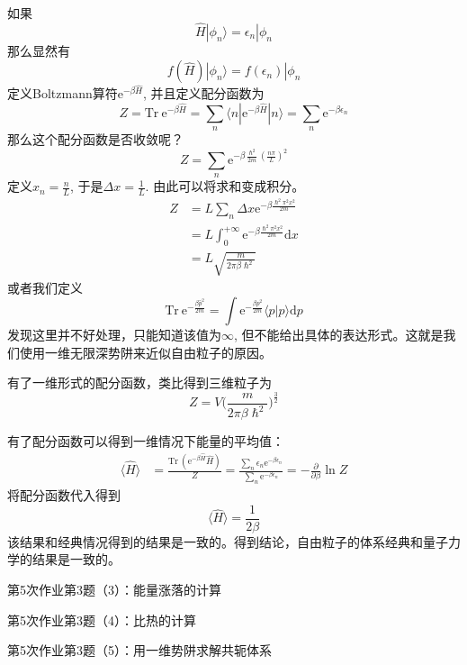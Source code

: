         如果
        \[ \hat{H} | \phi_n \rangle = \epsilon_n |\phi_n \]
        那么显然有
        \[ f(\hat{H})|\phi_n \rangle = f(\epsilon_n)|\phi_n \]
        定义Boltzmann算符$\mathrm{e}^{-\beta\hat{H}}$, 并且定义配分函数为
        \[ Z = \mathrm{Tr}\  \mathrm{e}^{-\beta \hat{H}} = \sum_n \langle n| \mathrm{e}^{-\beta \hat{H}} | n \rangle = \sum_n \mathrm{e}^{-\beta \epsilon_n }\]
        那么这个配分函数是否收敛呢？
        \[ Z = \sum_n \mathrm{e}^{-\beta \frac {\hslash^2}{2m} (\frac {n\pi}L)^2} \]
        定义$x_n = \frac nL$, 于是$\Delta x = \frac 1L$. 由此可以将求和变成积分。
        \begin{equation}\begin{aligned}
            Z &= L \sum_n \Delta x \mathrm{e}^{-\beta \frac {\hslash^2\pi^2 x^2}{2m} }\\
            &= L \int_0^{+\infty} \mathrm{e}^{-\beta \frac {\hslash^2\pi^2 x^2}{2m}} \mathrm{d}x\\
            &= L\sqrt{\frac m{2\pi \beta \hslash^2}}
        \end{aligned}\end{equation}
        或者我们定义
        \[ \mathrm{Tr} \ \mathrm{e}^{-\frac {\beta \hat{p}^2}{2m}} = \int \mathrm{e}^{-\frac {\beta p^2}{2m}} \langle p|p\rangle \mathrm{d}p \]
        发现这里并不好处理，只能知道该值为$\infty$, 但不能给出具体的表达形式。这就是我们使用一维无限深势阱来近似自由粒子的原因。

        有了一维形式的配分函数，类比得到三维粒子为
        \[ Z = V \bigg(\frac m{2\pi \beta \hslash^2}\bigg)^{\frac 32} \]

        有了配分函数可以得到一维情况下能量的平均值：
        \begin{equation}\begin{aligned}
            \langle \hat{H} \rangle &= \frac {\mathrm{Tr} \ (\mathrm{e}^{-\beta \hat{H}} \hat{H})}Z
            = \frac {\sum_n \epsilon_n \mathrm{e}^{-\beta \epsilon_n}}{\sum_n \mathrm{e}^{-\beta \epsilon_n}}
            = -\frac {\partial}{\partial \beta} \ln{Z}
        \end{aligned}\end{equation}
        将配分函数代入得到
        \[ \langle \hat{H} \rangle = \frac 1{2\beta} \]
        该结果和经典情况得到的结果是一致的。得到结论，自由粒子的体系经典和量子力学的结果是一致的。
        \begin{asg}
            第5次作业第3题（3）：能量涨落的计算
        \end{asg}
        \begin{asg}
            第5次作业第3题（4）：比热的计算
        \end{asg}
        \begin{asg}
            第5次作业第3题（5）：用一维势阱求解共轭体系
        \end{asg}

